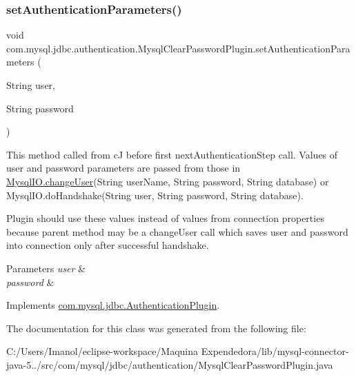\subsubsection{\texorpdfstring{set\+Authentication\+Parameters()}{setAuthenticationParameters()}}
{\footnotesize\ttfamily void com.\+mysql.\+jdbc.\+authentication.\+Mysql\+Clear\+Password\+Plugin.\+set\+Authentication\+Parameters (\begin{DoxyParamCaption}\item[{String}]{user,  }\item[{String}]{password }\end{DoxyParamCaption})}

This method called from cJ before first next\+Authentication\+Step call. Values of user and password parameters are passed from those in \mbox{\hyperlink{classcom_1_1mysql_1_1jdbc_1_1_mysql_i_o_a2b65fc2cb7cccdb5923da263d37019ad}{Mysql\+I\+O.\+change\+User}}(String user\+Name, String password, String database) or Mysql\+I\+O.\+do\+Handshake(String user, String password, String database).

Plugin should use these values instead of values from connection properties because parent method may be a change\+User call which saves user and password into connection only after successful handshake.


\begin{DoxyParams}{Parameters}
{\em user} & \\
\hline
{\em password} & \\
\hline
\end{DoxyParams}


Implements \mbox{\hyperlink{interfacecom_1_1mysql_1_1jdbc_1_1_authentication_plugin_af47d83abdb04823681f23b027ec19379}{com.\+mysql.\+jdbc.\+Authentication\+Plugin}}.



The documentation for this class was generated from the following file\+:\begin{DoxyCompactItemize}
\item 
C\+:/\+Users/\+Imanol/eclipse-\/workspace/\+Maquina Expendedora/lib/mysql-\/connector-\/java-\/5../src/com/mysql/jdbc/authentication/Mysql\+Clear\+Password\+Plugin.\+java\end{DoxyCompactItemize}
